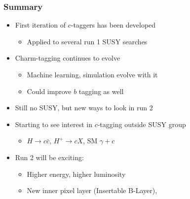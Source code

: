 \documentclass[usenames,dvipsnames]{beamer}
\begin{document}
\begin{frame}
  \frametitle{Summary}
  \begin{itemize}
  \item First iteration of $c$-taggers has been developed
    \begin{itemize}
    \item Applied to several run 1 SUSY searches
    \end{itemize}
  \item Charm-tagging continues to evolve
    \begin{itemize}
    \item Machine learning, simulation evolve with it
    \item Could improve $b$ tagging as well
    \end{itemize}
  \item Still no SUSY, but new ways to look in run 2
  \item Starting to see interest in $c$-tagging outside SUSY group
    \begin{itemize}
      \item $H \to c\bar{c}$, $H^{+} \to cX$, SM $\gamma + c$
    \end{itemize}
  \item Run 2 will be exciting:
    \begin{itemize}
      \item Higher energy, higher luminosity
      \item New inner pixel layer (Insertable B-Layer),
    \end{itemize}
  \end{itemize}
\end{frame}

\end{document}
